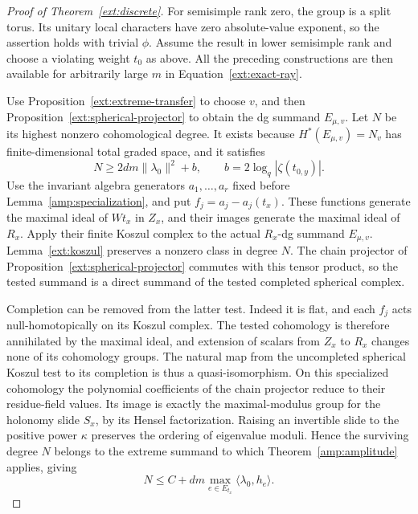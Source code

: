 \begin{proof}[Proof of Theorem~\ref{ext:discrete}]
 For semisimple rank zero, the group is a split torus.  Its unitary
 local characters have zero absolute-value exponent, so the assertion
 holds with trivial $\phi$.  Assume the result in lower semisimple rank
 and choose a violating weight $t_0$ as above.  All the preceding
 constructions are then available for arbitrarily large $m$ in
 Equation~\eqref{ext:exact-ray}.

 Use Proposition~\ref{ext:extreme-transfer} to choose $v$, and then
 Proposition~\ref{ext:spherical-projector} to obtain the dg summand
 $E_{\mu,v}$.  Let $N$ be its highest nonzero cohomological degree.
 It exists because $H^*(E_{\mu,v})=N_v$ has finite-dimensional total
 graded space, and it satisfies
 \begin{equation}\label{ext:top-lower}
       N\ge 2dm\|\lambda_0\|^2+b,
       \qquad b=2\log_q|\zeta(t_{0,y})|.
 \end{equation}
 Use the invariant algebra generators $a_1,\ldots,a_r$ fixed before
 Lemma~\ref{amp:specialization}, and put $f_j=a_j-a_j(t_x)$.
 These functions generate the maximal ideal of $Wt_x$ in $Z_x$,
 and their images generate the
 maximal ideal of $R_x$.  Apply their finite Koszul complex to the
 actual $R_x$-dg summand $E_{\mu,v}$.
 Lemma~\ref{ext:koszul} preserves a nonzero class in degree $N$.
 The chain projector of Proposition~\ref{ext:spherical-projector}
 commutes with this tensor product, so the tested summand is a
 direct summand of the tested completed spherical complex.

 Completion can be removed from the latter test.  Indeed it is
 flat, and each $f_j$ acts null-homotopically on its Koszul complex.
 The tested cohomology is therefore annihilated by the maximal
 ideal, and extension of scalars from $Z_x$ to $R_x$ changes
 none of its cohomology groups.  The natural map from the
 uncompleted spherical Koszul test to its completion is thus
 a quasi-isomorphism.  On this specialized cohomology the polynomial
 coefficients of the chain projector reduce to their residue-field
 values.  Its image is exactly the maximal-modulus group for the
 holonomy slide $S_x$, by its Hensel factorization.  Raising an
 invertible slide to the positive power $\kappa$ preserves the
 ordering of eigenvalue moduli.  Hence the surviving degree $N$
 belongs to the extreme summand to which
 Theorem~\ref{amp:amplitude} applies, giving
 \begin{equation}\label{ext:top-upper}
      N\le C+dm\max_{e\in E_{t_x}}
                                  \langle\lambda_0,h_e\rangle.
 \end{equation}


\end{proof}
